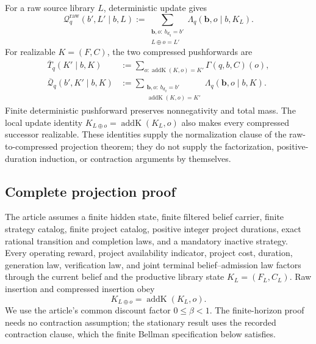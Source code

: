 For a raw source library \(L\), deterministic update gives
\[
 \mathcal Q_q^{\mathrm{raw}}(b',L'\mid b,L)
 :=\sum_{\substack{\mathbf b,o:\ b_{d_q}=b'\\L\oplus o=L'}}
   \Lambda_q(\mathbf b,o\mid b,K_L).
\]
For realizable \(K=(F,C)\), the two compressed pushforwards are
\begin{align}
 \overline T_q(K'\mid b,K)
   &:=\sum_{o:\operatorname{addK}(K,o)=K'}
       \Gamma(q,b,C)(o),
   \label{eq:or-compressed-outcome-law}\\
 \overline{\mathcal Q}_q(b',K'\mid b,K)
   &:=\sum_{\substack{\mathbf b,o:\ b_{d_q}=b'\\
       \operatorname{addK}(K,o)=K'}}
       \Lambda_q(\mathbf b,o\mid b,K).
   \label{eq:or-compressed-joint-law}
\end{align}
Finite deterministic pushforward preserves nonnegativity and total mass.
The local update identity
\(K_{L\oplus o}=\operatorname{addK}(K_L,o)\) also makes every compressed
successor realizable. These identities supply the normalization clause of the
raw-to-compressed projection theorem; they do not supply the factorization,
positive-duration induction, or contraction arguments by themselves.

\subsection{Complete projection proof}

The article assumes a finite hidden state, finite filtered belief
carrier, finite strategy catalog, finite project catalog, positive integer
project durations, exact rational transition and completion laws, and a
mandatory inactive strategy. Every operating reward, project availability
indicator, project cost, duration, generation law, verification law, and
joint terminal belief--admission law factors through the current belief and
the productive library state \(K_L=(F_L,C_L)\). Raw insertion and compressed
insertion obey
\begin{equation}
 K_{L\oplus o}=\operatorname{addK}(K_L,o).
 \label{eq:or-local-update}
\end{equation}
We use the article's common discount factor $0\leq\beta<1$. The
finite-horizon proof needs no contraction assumption; the stationary result
uses the recorded contraction clause, which the finite Bellman specification
below satisfies.

